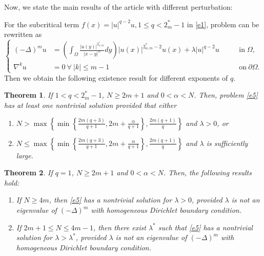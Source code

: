 \documentclass[reqno]{amsart}
\newtheorem{theorem}{Theorem}
\newcommand{\DD} {\displaystyle}
\newcommand{\la} {\lambda}
\newcommand{\Om}{\Omega}
\newcommand{\al} {\alpha}
\newcommand{\noi} {  \noindent}
\newcommand{\mb} {\mathbb}
\numberwithin{theorem}{section} \numberwithin{equation}{section}
\begin{document}

\vspace{.2cm}
\noi Now, we state the main results of the article with different perturbation:

\vspace{.07cm}
\noi For the subcritical term $f(x)=|u|^{q-2}u, 1\leq q<2^{*}_m-1$ in \eqref{e1}, problem can be rewritten as\\
\begin{equation}\label{e5}
\left \{
\begin{aligned}
(-\Delta)^m u &= \left(\DD\int_{\Om}\frac{|u(y)|^{2_{\al,m}^{*}}}{|x-y|^{\al}}dy\right)  {|u(x)|^{2_{\al,m}^{*}-2} u(x)}+ \la |u|^{q-2}u \quad \,&& \text{in}\; \Om,\\
\nabla^k u &=0 \ \forall \  |k|\leq m-1 \,&& \text{on}\ \partial\Om.
\end{aligned}\right.
\end{equation}
Then we obtain the following existence result for different exponents of $q$.
\begin{theorem}\label{t1}
If $1<q<2^{*}_m-1$, $N\geq2m+1$ and $0<\al<N$. Then, problem \eqref{e5} has at least one nontrivial solution provided that either
\begin{enumerate}
\item  $N>\max \left\{\min \left\{\frac{2m(q+3)}{q+1}, 2m+\frac{\al}{q+1}\right\}, \frac{2m(q+1)}{q}\right\}$ and $\la>0$, or
\item  $N \leq \max \left\{\min \left\{\frac{2m(q+3)}{q+1}, 2m+\frac{\al}{q+1}\right\}, \frac{2m(q+1)}{q}\right\}$ and $\la$ is sufficiently large.
\end{enumerate}
\end{theorem}
\begin{theorem} \label{t4}
If $q=1$, $N\geq2m+1$ and $0<\al<N$. Then, the following results hold:
\begin{enumerate}
\item  If $N\geq4m$, then \eqref{e5} has a nontrivial solution for $\la>0$, provided $\la$ is not an eigenvalue of $(-\Delta)^m$ with homogeneous Dirichlet boundary condition.\\
\item If $2m+1 \leq N \leq 4m-1$, then there exist $\la^*$ such that \eqref{e5} has a nontrivial solution for $\la>\la^*$, provided $\la$ is not an eigenvalue of 
$(-\Delta)^m$ with homogeneous Dirichlet boundary condition.\\ 
\end{enumerate}
\end{theorem}
\end{document}
